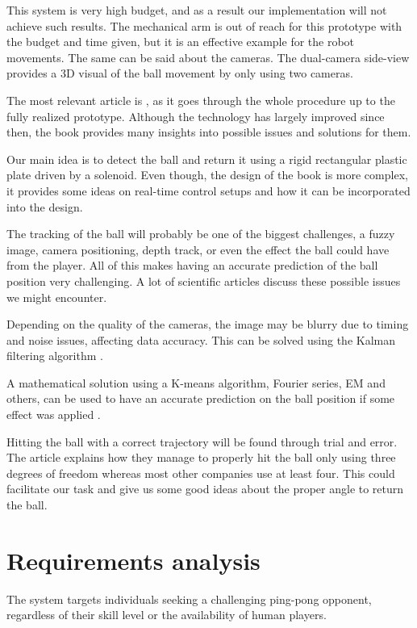 This system is very high budget, and as a result our implementation will not achieve such results. The mechanical arm is out of reach for this prototype with the budget and time given, but it is an effective example for the robot movements. The same can be said about the cameras. The dual-camera side-view provides a 3D visual of the ball movement by only using two cameras.

The most relevant article is \cite{Acosta2004}, as it goes through the whole procedure up to the fully realized prototype. Although the technology has largely improved since then, the book provides many insights into possible issues and solutions for them.

Our main idea is to detect the ball and return it using a rigid rectangular plastic plate driven by a solenoid. Even though, the design of the book \cite{Yu2012} is more complex, it provides some ideas on real-time control setups and how it can be incorporated into the design.

The tracking of the ball will probably be one of the biggest challenges, a fuzzy image, camera positioning, depth track, or even the effect the ball could have from the player. All of this makes having an accurate prediction of the ball position very challenging. A lot of scientific articles discuss these possible issues we might encounter.

Depending on the quality of the cameras, the image may be blurry due to timing and noise issues, affecting data accuracy. This can be solved using the Kalman filtering algorithm \cite{Lu2020}.

A mathematical solution using a K-means algorithm, Fourier series, EM and others, can be used to have an accurate prediction on the ball position if some effect was applied  \cite{Zhao2017}.

Hitting the ball with a correct trajectory will be found through trial and error. The article \cite{Trasloheros2014} explains how they manage to properly hit the ball only using three degrees of freedom whereas most other companies use at least four. This could facilitate our task and give us some good ideas about the proper angle to return the ball.


\section{Requirements analysis}

The system targets individuals seeking a challenging ping-pong opponent, regardless of their skill level or the availability of human players.

